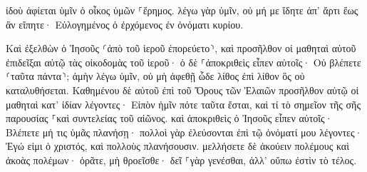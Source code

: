 \documentclass{openreader}
\begin{document}
ἰδοὺ ἀφίεται ὑμῖν ὁ οἶκος ὑμῶν ⸀ἔρημος. 
λέγω γὰρ ὑμῖν, οὐ μή με ἴδητε ἀπ’ ἄρτι ἕως ἂν εἴπητε· Εὐλογημένος ὁ ἐρχόμενος ἐν ὀνόματι κυρίου. 

Καὶ ἐξελθὼν ὁ Ἰησοῦς ⸂ἀπὸ τοῦ ἱεροῦ ἐπορεύετο⸃, καὶ προσῆλθον οἱ μαθηταὶ αὐτοῦ ἐπιδεῖξαι αὐτῷ τὰς οἰκοδομὰς τοῦ ἱεροῦ· 
ὁ δὲ ⸀ἀποκριθεὶς εἶπεν αὐτοῖς· Οὐ βλέπετε ⸂ταῦτα πάντα⸃; ἀμὴν λέγω ὑμῖν, οὐ μὴ ἀφεθῇ ὧδε λίθος ἐπὶ λίθον ὃς οὐ καταλυθήσεται. 
Καθημένου δὲ αὐτοῦ ἐπὶ τοῦ Ὄρους τῶν Ἐλαιῶν προσῆλθον αὐτῷ οἱ μαθηταὶ κατ’ ἰδίαν λέγοντες· Εἰπὸν ἡμῖν πότε ταῦτα ἔσται, καὶ τί τὸ σημεῖον τῆς σῆς παρουσίας ⸀καὶ συντελείας τοῦ αἰῶνος. 
καὶ ἀποκριθεὶς ὁ Ἰησοῦς εἶπεν αὐτοῖς· Βλέπετε μή τις ὑμᾶς πλανήσῃ· 
πολλοὶ γὰρ ἐλεύσονται ἐπὶ τῷ ὀνόματί μου λέγοντες· Ἐγώ εἰμι ὁ χριστός, καὶ πολλοὺς πλανήσουσιν. 
μελλήσετε δὲ ἀκούειν πολέμους καὶ ἀκοὰς πολέμων· ὁρᾶτε, μὴ θροεῖσθε· δεῖ ⸀γὰρ γενέσθαι, ἀλλ’ οὔπω ἐστὶν τὸ τέλος. 
\end{document}
